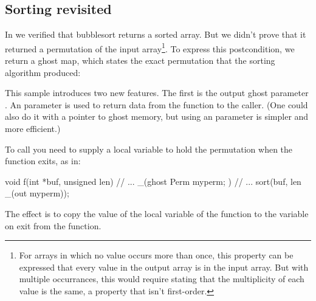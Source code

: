 \subsection{Sorting revisited}
\label{sect:sorting-perm}

In  we verified that bubblesort returns a sorted array.
But we didn't prove that it returned a permutation of the input
array\footnote{For arrays in which no value occurs more than once,
  this property can be expressed that every value in the output array
  is in the input array. But with multiple occurrances, this would
  require stating that the multiplicity of each value is the same, a
  property that isn't first-order.
}. To express this postcondition, we return a ghost map, which states the
exact permutation that the sorting algorithm produced:


This sample introduces two new features.
The first is the output ghost parameter .
An  parameter is used to return data from the function to the
caller. (One could also do it with a pointer to ghost memory, but
using an  parameter is simpler and more efficient.)

To call  you need to supply a local variable to hold
the permutation when the function exits, as in:
\begin{VCC}
void f(int *buf, unsigned len)
  // ...
{
  _(ghost Perm myperm; )
  // ...
  sort(buf, len _(out myperm));
}
\end{VCC}
The effect is to copy the value of the local variable  of the
function to the variable  on exit from the function.

